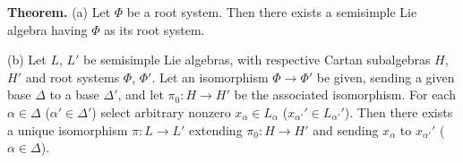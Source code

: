 \textbf{Theorem.} (a) Let $\Phi$ be a root system. Then there exists a semisimple Lie algebra having $\Phi$ as its root system.

(b) Let $L$, $L'$ be semisimple Lie algebras, with respective Cartan subalgebras $H$, $H'$ and root systems $\Phi$, $\Phi'$. Let an isomorphism $\Phi \to \Phi'$ be given, sending a given base $\Delta$ to a base $\Delta'$, and let $\pi_0: H \to H'$ be the associated isomorphism. For each $\alpha \in \Delta$ ($\alpha' \in \Delta'$) select arbitrary nonzero $x_{\alpha} \in L_{\alpha}$ ($x_{\alpha'}' \in L_{\alpha'}'$). Then there exists a unique isomorphism $\pi: L \to L'$ extending $\pi_0: H \to H'$ and sending $x_{\alpha}$ to $x_{\alpha'}'$ ($\alpha \in \Delta$).
